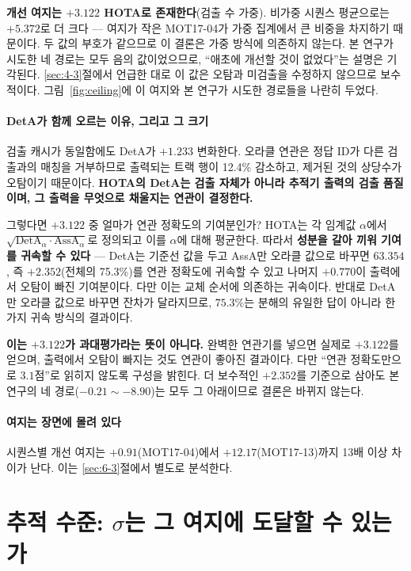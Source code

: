 \documentclass[12pt,a4paper,oneside]{report}
\begin{document}
\textbf{개선 여지는 $+3.122$ HOTA로 존재한다}(검출 수 가중). 비가중 시퀀스 평균으로는 $+5.372$로 더 크다 --- 여지가 작은 MOT17-04가 가중 집계에서 큰 비중을 차지하기 때문이다. 두 값의 부호가 같으므로 이 결론은 가중 방식에 의존하지 않는다. 본 연구가 시도한 네 경로는 모두 음의 값이었으므로, ``애초에 개선할 것이 없었다''는 설명은 기각된다. \ref{sec:4-3}절에서 언급한 대로 이 값은 오탐과 미검출을 수정하지 않으므로 보수적이다. 그림~\ref{fig:ceiling}에 이 여지와 본 연구가 시도한 경로들을 나란히 두었다.

\paragraph{DetA가 함께 오르는 이유, 그리고 그 크기} 검출 캐시가 동일함에도 DetA가 $+1.233$ 변화한다. 오라클 연관은 정답 ID가 다른 검출과의 매칭을 거부하므로 출력되는 트랙 행이 12.4\% 감소하고, 제거된 것의 상당수가 오탐이기 때문이다. \textbf{HOTA의 DetA는 검출 자체가 아니라 추적기 출력의 검출 품질이며, 그 출력을 무엇으로 채울지는 연관이 결정한다.}

그렇다면 $+3.122$ 중 얼마가 연관 정확도의 기여분인가? HOTA는 각 임계값 $\alpha$에서 $\sqrt{\mathrm{DetA}_\alpha \cdot \mathrm{AssA}_\alpha}$로 정의되고 이를 $\alpha$에 대해 평균한다. 따라서 \textbf{성분을 갈아 끼워 기여를 귀속할 수 있다} --- DetA는 기준선 값을 두고 AssA만 오라클 값으로 바꾸면 $63.354$, 즉 $+2.352$(전체의 75.3\%)를 연관 정확도에 귀속할 수 있고 나머지 $+0.770$이 출력에서 오탐이 빠진 기여분이다. 다만 이는 교체 순서에 의존하는 귀속이다. 반대로 DetA만 오라클 값으로 바꾸면 잔차가 달라지므로, $75.3\%$는 분해의 유일한 답이 아니라 한 가지 귀속 방식의 결과이다.

\textbf{이는 $+3.122$가 과대평가라는 뜻이 아니다.} 완벽한 연관기를 넣으면 실제로 $+3.122$를 얻으며, 출력에서 오탐이 빠지는 것도 연관이 좋아진 결과이다. 다만 ``연관 정확도만으로 $3.1$점''로 읽히지 않도록 구성을 밝힌다. 더 보수적인 $+2.352$를 기준으로 삼아도 본 연구의 네 경로($-0.21 \sim -8.90$)는 모두 그 아래이므로 결론은 바뀌지 않는다.

\paragraph{여지는 장면에 몰려 있다} 시퀀스별 개선 여지는 $+0.91$(MOT17-04)에서 $+12.17$(MOT17-13)까지 13배 이상 차이가 난다. 이는 \ref{sec:6-3}절에서 별도로 분석한다.

\section{추적 수준: $\sigma$는 그 여지에 도달할 수 있는가}\label{sec:5-7}
\end{document}
